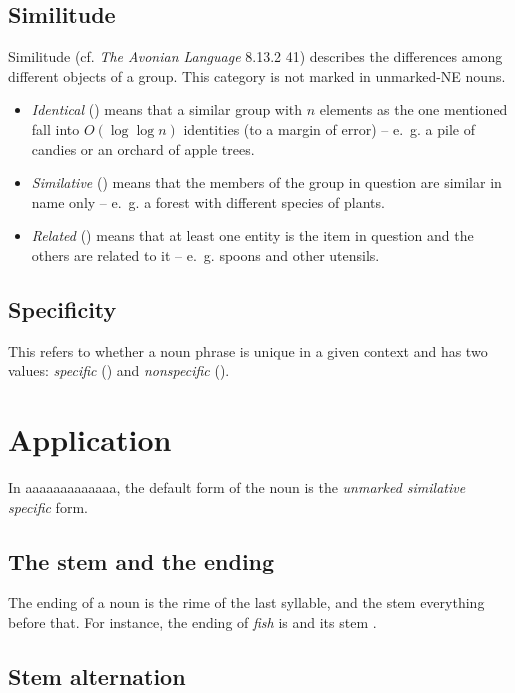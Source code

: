 \documentclass{book}
\newcommand{\lname}{aaaaaaaaaaaaa}
\begin{document}
\subsection{Similitude}

Similitude (cf. \emph{The Avonian Language} 8.13.2 41) describes the differences among different objects of a group. This category is not marked in unmarked-NE nouns.

\begin{itemize}
  \item \emph{Identical} () means that a similar group with $n$ elements as the one mentioned fall into $O(\log \log n)$ identities (to a margin of error) -- e.~g. a pile of candies or an orchard of apple trees.
  \item \emph{Similative} () means that the members of the group in question are similar in name only -- e.~g. a forest with different species of plants.
  \item \emph{Related} () means that at least one entity is the item in question and the others are related to it -- e.~g. spoons and other utensils.
\end{itemize}

\subsection{Specificity}

This refers to whether a noun phrase is unique in a given context and has two values: \emph{specific} () and \emph{nonspecific} ().

\section{Application}

In \lname{}, the default form of the noun is the \emph{unmarked similative specific} form.


\subsection{The stem and the ending}

The ending of a noun is the rime of the last syllable, and the stem everything before that. For instance, the ending of  \emph{fish} is  and its stem .

\subsection{Stem alternation}
\end{document}
